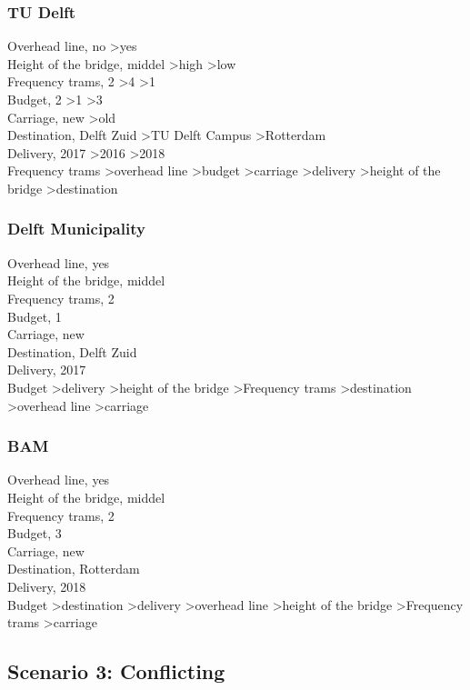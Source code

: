 \documentclass{article}
\begin{document}
\subsubsection*{TU Delft}
Overhead line, no \textgreater yes \\
Height of the bridge, middel  \textgreater high \textgreater low \\
Frequency trams, 2 \textgreater 4 \textgreater 1 \\
Budget, 2 \textgreater 1 \textgreater 3 \\
Carriage, new \textgreater old \\
Destination, Delft Zuid \textgreater TU Delft Campus \textgreater Rotterdam \\
Delivery, 2017 \textgreater 2016 \textgreater 2018 \\


Frequency trams \textgreater overhead line \textgreater budget \textgreater carriage \textgreater delivery \textgreater height of the bridge \textgreater destination \\

\subsubsection*{Delft Municipality}
Overhead line, yes \\
Height of the bridge, middel \\
Frequency trams, 2 \\
Budget, 1 \\
Carriage, new \\
Destination, Delft Zuid \\
Delivery, 2017 \\


Budget \textgreater delivery \textgreater height of the bridge \textgreater Frequency trams \textgreater destination \textgreater overhead line \textgreater carriage\\

\subsubsection*{BAM}
Overhead line, yes \\
Height of the bridge, middel \\
Frequency trams, 2 \\
Budget, 3 \\
Carriage, new \\
Destination, Rotterdam \\
Delivery, 2018 \\


Budget \textgreater destination \textgreater delivery \textgreater overhead line \textgreater height of the bridge \textgreater Frequency trams \textgreater carriage\\

\subsection{Scenario 3: Conflicting}
\end{document}
